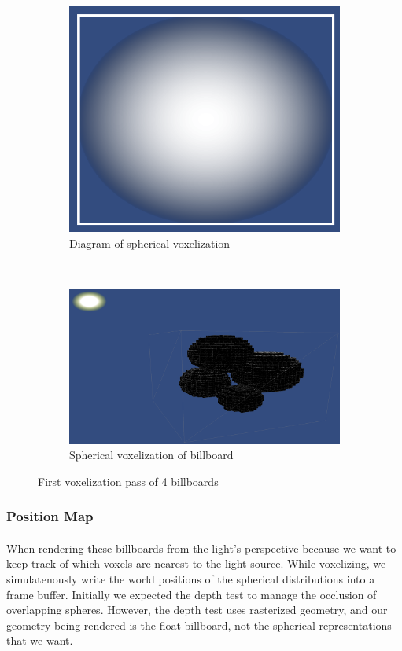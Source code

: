 \begin{figure}[t]
\begin{subfigure}[t]{0.48\textwidth}
	\includegraphics[width=\textwidth]{../res/spherebillboard.png}
	\caption{Diagram of spherical voxelization}
	\end{subfigure}
	~
	\begin{subfigure}[t]{0.48\textwidth}
	\includegraphics[width=\textwidth]{../res/voxelize1.png}
	\caption{Spherical voxelization of billboard}
	\end{subfigure}

\caption{First voxelization pass of 4 billboards}
\end{figure}

\newpage
\subsubsection{Position Map}\paragraph{}
When rendering these billboards from the light's perspective because we want to keep track of which voxels are nearest to the light source. While voxelizing, we simulatenously write the world positions of the spherical distributions into a frame buffer. 
Initially we expected the depth test to manage the occlusion of overlapping spheres. 
However, the depth test uses rasterized geometry, and our geometry being rendered is the float billboard, not the spherical representations that we want. 

